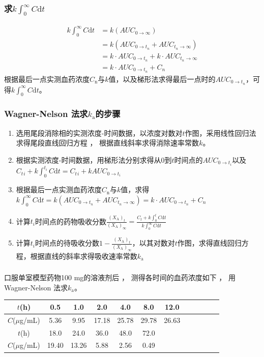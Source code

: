 \documentclass[dvipsnames, svgnames, x11names]{beamer}
\begin{document}
\begin{frame}
    \frametitle{求$k\int_{0}^{\infty}C\mathrm{d}t$}
    \[
        \begin{aligned}
            k\int_{0}^{\infty}C\mathrm{d}t&=k(AUC_{0\to \infty}) \\
            &=k(AUC_{0\to t_n}+AUC_{t_n\to\infty}) \\
            &=k\cdot AUC_{0\to t_n} + k\cdot AUC_{t_n\to\infty}\\
            &=k\cdot AUC_{0\to t_n}+C_n
        \end{aligned}
    \]
    根据最后一点实测血药浓度$C_\mathrm{n}$与$k$值，以及梯形法求得最后一点时的$AUC_{0\to t_n}$，可得$k\int_{0}^{\infty}C\mathrm{d}t$。
\end{frame}


\begin{frame}
    \frametitle{Wagner-Nelson 法求$k_\mathrm{a}$的步骤}
    \begin{enumerate}
      \item 选用尾段消除相的实测浓度-时间数据，以浓度对数对$t$作图，采用线性回归法求得尾段直线回归方程 ， 根据直线斜率求得消除速率常数$k$。
      \item 根据实测浓度-时间数据，用梯形法分别求得从0到$t$时间点的$AUC_{0\to t_i}$以及$C{_t{_i}}+k\int_{0}^{t_i}C\mathrm{d}t=C_t{_i}+kAUC_{0\to t_i}$
      \item 根据最后一点实测血药浓度$C_\mathrm{n}$与$k$值，求得$k\int_{0}^{\infty}C\mathrm{d}t=k(AUC_{0\to t_n}+AUC_{t_n\to\infty})=k\cdot AUC_{0\to t_n}+C_n$
      \item 计算$t{_i}$时间点的药物吸收分数$\frac{(X_{\mathrm{A}})_{t}}{(X_{\mathrm{A}})_{\infty}}=\frac{C_{t}+k\int_{0}^{t}C\mathrm{d}t}{k\int_{0}^{\infty}C\mathrm{d}t}$
      \item 计算$t_i$时间点的待吸收分数$1-\frac{(X_{\mathrm{A}})_{t}}{(X_{\mathrm{A}})_{\infty}}$，以其对数对$t$作图，求得直线回归方程，根据直线的斜率求得吸收速率常数$k_\mathrm{a}$
    \end{enumerate}
\end{frame}


\begin{frame}[t]
    \frametitle{}
    \begin{example}
        口服单室模型药物100 mg的溶液剂后 ， 测得各时间的血药浓度如下 ， 用Wagner-Nelson 法求$k_\mathrm{a}$。
        \begin{table}
            \centering
            \begin{tabular}{cccccccccccc}
                \bottomrule
                $t$(h) & 0.5 & 1.0 & 2.0 & 4.0 & 8.0 & 12.0 \\ \hline
                $C$($\mu$g/mL) & 5.36 & 9.95 & 17.18 & 25.78 & 29.78 & 26.63 \\ \bottomrule \bottomrule
                $t$(h) & 18.0 & 24.0 & 36.0 & 48.0 & 72.0 \\ \hline
                $C$($\mu$g/mL) & 19.40 & 13.26 & 5.88 & 2.56 & 0.49 \\ \toprule 
            \end{tabular}
        \end{table}
    \end{example}
\end{frame}
\end{document}
